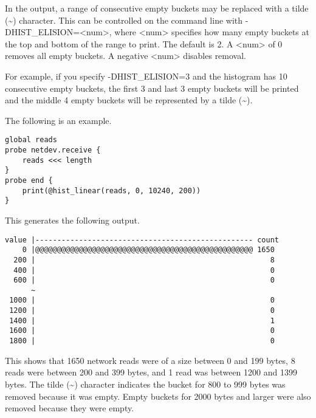 \documentclass[twoside,english]{article}
\newenvironment{vindent}
{\begin{list}{}{\setlength{\listparindent}{6pt}}
\item[]}
{\end{list}}
\begin{document}
In the output, a range of consecutive empty buckets may be replaced with a tilde
(\textasciitilde{}) character.  This can be controlled on the command line
with -DHIST\_ELISION=\textless\hspace{1 sp}num\textgreater\hspace{1 sp},
where \textless\hspace{1 sp}num\textgreater\hspace{1 sp} specifies how many
empty buckets at the top and bottom of the range to print.
The default is 2.  A \textless\hspace{1 sp}num\textgreater\hspace{1 sp} of 0
removes all empty buckets. A negative \textless\hspace{1 sp}num\textgreater\hspace{1 sp}
disables removal.

For example, if you specify -DHIST\_ELISION=3 and the histogram has 10
consecutive empty buckets, the first 3 and last 3 empty buckets will
be printed and the middle 4 empty buckets will be represented by a
tilde (\textasciitilde{}).

The following is an example.

\begin{vindent}
\begin{verbatim}
global reads
probe netdev.receive {
    reads <<< length
}
probe end {
    print(@hist_linear(reads, 0, 10240, 200))
}
\end{verbatim}
\end{vindent}
This generates the following output.

\begin{samepage}
\begin{vindent}
\begin{verbatim}
value |-------------------------------------------------- count
    0 |@@@@@@@@@@@@@@@@@@@@@@@@@@@@@@@@@@@@@@@@@@@@@@@@@@ 1650
  200 |                                                      8
  400 |                                                      0
  600 |                                                      0
      ~
 1000 |                                                      0
 1200 |                                                      0
 1400 |                                                      1
 1600 |                                                      0
 1800 |                                                      0
\end{verbatim}
\end{vindent}
\end{samepage}
This shows that 1650 network reads were of a size between 0 and 199 bytes,
8 reads were between 200 and 399 bytes, and 1 read was between
1200 and 1399 bytes.  The tilde (\textasciitilde{}) character indicates
the bucket for 800 to 999 bytes was removed because it was empty.
Empty buckets for 2000 bytes and larger were also removed because they
were empty.
\end{document}

